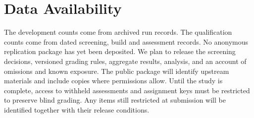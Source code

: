 \section*{Data Availability}
The development counts come from archived run records. The qualification counts come from dated screening, build and assessment records. No anonymous replication package has yet been deposited. We plan to release the screening decisions, versioned grading rules, aggregate results, analysis, and an account of omissions and known exposure. The public package will identify upstream materials and include copies where permissions allow. Until the study is complete, access to withheld assessments and assignment keys must be restricted to preserve blind grading. Any items still restricted at submission will be identified together with their release conditions.
